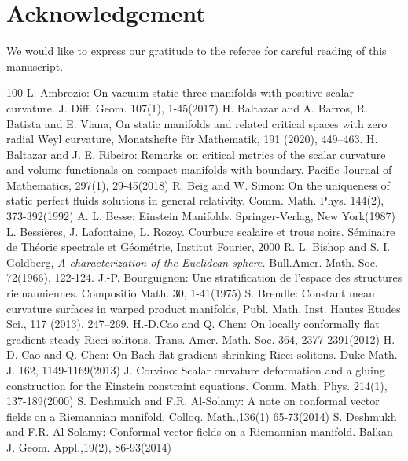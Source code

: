 \documentclass[10pt,leqno,oneside]{amsart}
\begin{document}
{ \section{Acknowledgement}
        We would like to express our gratitude to the referee for careful reading of this manuscript.
\begin{thebibliography}{100}
       L. Ambrozio: On vacuum static three-manifolds with positive scalar curvature. J. Diff. Geom. 107(1), 1-45(2017)
       H. Baltazar and A. Barros, R. Batista and E. Viana, On static manifolds and related critical spaces with zero radial Weyl curvature, Monatshefte f\"ur Mathematik, 191 (2020), 449–463.
       H. Baltazar and J. E. Ribeiro: Remarks on critical metrics of the scalar curvature and volume functionals on compact manifolds with boundary. Pacific Journal of Mathematics, 297(1), 29-45(2018)
       R. Beig and W. Simon: On the uniqueness of static perfect fluids solutions in general relativity. Comm. Math. Phys. 144(2), 373-392(1992)
       A. L. Besse: Einstein Manifolds. Springer-Verlag, New York(1987)
       L. Bessi\`eres, J. Lafontaine, L. Rozoy. Courbure scalaire et trous noirs. S\'eminaire de Th\'eorie spectrale et G\'eom\'etrie, Institut Fourier, 2000
       R. L. Bishop and S. I. Goldberg, {\it A characterization of the Euclidean sphere.} Bull.Amer. Math. Soc. 72(1966), 122-124.
       J.-P. Bourguignon: Une stratification de l'espace des structures riemanniennes. Compositio Math. 30, 1-41(1975)
       S. Brendle: Constant mean curvature surfaces in warped product manifolds, Publ. Math. Inst. Hautes Etudes Sci., 117 (2013), 247–269.
       H.-D.Cao and Q. Chen: On locally conformally flat gradient steady Ricci solitons. Trans. Amer. Math. Soc. 364, 2377-2391(2012)
       H.-D. Cao and Q. Chen: On Bach-flat gradient shrinking Ricci solitons. Duke Math. J. 162, 1149-1169(2013)
       J. Corvino: Scalar curvature deformation and a gluing construction for the Einstein constraint equations. Comm. Math. Phys. 214(1), 137-189(2000)
       { S. Deshmukh and F.R. Al-Solamy: A note on conformal vector fields on a Riemannian manifold. Colloq. Math.,136(1) 65-73(2014)}
       { S. Deshmukh and F.R. Al-Solamy: Conformal vector fields on a Riemannian manifold. Balkan J. Geom. Appl.,19(2), 86-93(2014)}

\end{thebibliography}}
\end{document}
